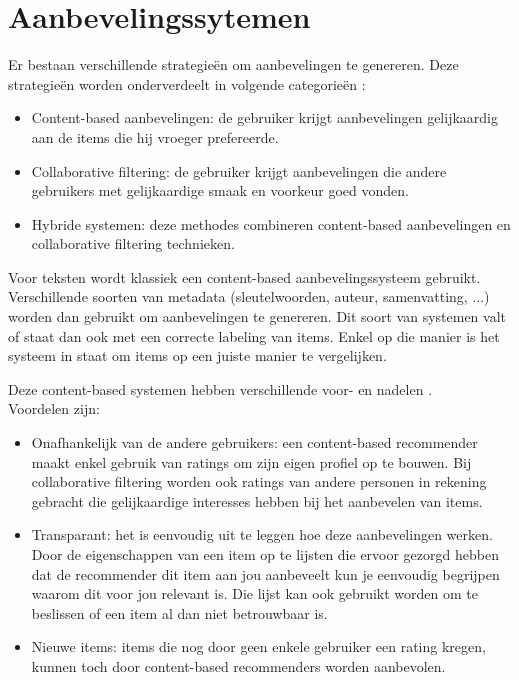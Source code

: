 \section{Aanbevelingssytemen}	
Er bestaan verschillende strategie\"en om aanbevelingen te genereren. Deze strategie\"en worden onderverdeelt in volgende categorie\"en \cite{Adomavicius2005}: 
\begin{itemize}
\item Content-based aanbevelingen: de gebruiker krijgt aanbevelingen gelijkaardig aan de items die hij vroeger prefereerde.
\item Collaborative filtering: de gebruiker krijgt aanbevelingen die andere gebruikers met gelijkaardige smaak en voorkeur goed vonden. 
\item Hybride systemen: deze methodes combineren content-based aanbevelingen en collaborative filtering technieken.
\end{itemize}

Voor teksten wordt klassiek een content-based aanbevelingssysteem gebruikt. Verschillende soorten van metadata (sleutelwoorden, auteur, samenvatting, ...) worden dan gebruikt om aanbevelingen te genereren. Dit soort van systemen valt of staat dan ook met een correcte labeling van items. Enkel op die manier is het systeem in staat om items op een juiste manier te vergelijken. 

Deze content-based systemen hebben verschillende voor- en nadelen \cite{Bogers2009b}. \\Voordelen zijn:
\begin{itemize}
\item Onafhankelijk van de andere gebruikers: een content-based recommender maakt enkel gebruik van ratings om zijn eigen profiel op te bouwen. Bij collaborative filtering worden ook ratings van andere personen in rekening gebracht die gelijkaardige interesses hebben bij het aanbevelen van items. 
\item Transparant: het is eenvoudig uit te leggen hoe deze aanbevelingen werken. Door de eigenschappen van een item op te lijsten die ervoor gezorgd hebben dat de recommender dit item aan jou aanbeveelt kun je eenvoudig begrijpen waarom dit voor jou relevant is. Die lijst kan ook gebruikt worden om te beslissen of een item al dan niet betrouwbaar is.
\item Nieuwe items: items die nog door geen enkele gebruiker een rating kregen, kunnen toch door content-based recommenders worden aanbevolen.
\end{itemize}

